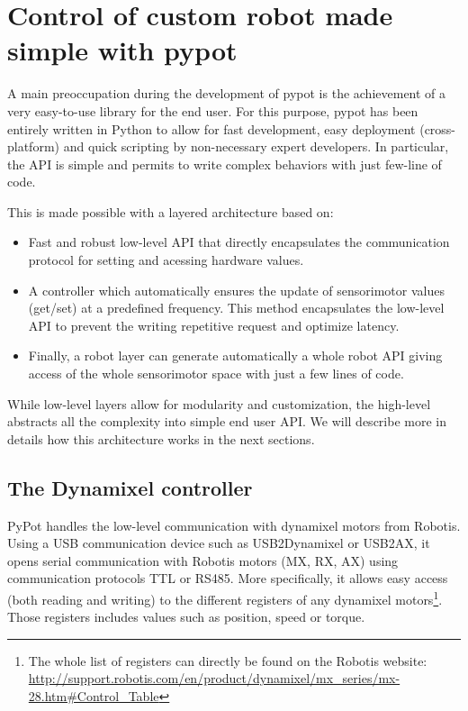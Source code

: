 \section{Control of custom robot made simple with pypot} %

A main preoccupation during the development of pypot is the achievement of a very easy-to-use library for the end user. For this purpose, pypot has been entirely written in Python to allow for fast development, easy deployment (cross-platform) and quick scripting by non-necessary expert developers. In particular, the API is simple and permits to write complex behaviors with just few-line of code.

This is made possible with a layered architecture based on:

\begin{itemize}
    \item Fast and robust low-level API that directly encapsulates the communication protocol for setting and acessing hardware values.
    \item A controller which automatically ensures the update of sensorimotor values (get/set) at a predefined frequency. This method encapsulates the low-level API to prevent the writing repetitive request and optimize latency.
    \item Finally, a robot layer can generate automatically a whole robot API giving access of the whole sensorimotor space with just a few lines of code.
\end{itemize}

While low-level layers allow for modularity and customization, the high-level abstracts all the complexity into simple end user API. We will describe more in details how this architecture works in the next sections.


\subsection{The Dynamixel controller} %

PyPot handles the low-level communication with dynamixel motors from Robotis. Using a USB communication device such as USB2Dynamixel or USB2AX, it opens serial communication with Robotis motors (MX, RX, AX) using communication protocols TTL or RS485. More specifically, it allows easy access (both reading and writing) to the different registers of any dynamixel motors\footnote{The whole list of registers can directly be found on the Robotis website: \url{http://support.robotis.com/en/product/dynamixel/mx_series/mx-28.htm\#Control_Table}}. Those registers includes values such as position, speed or torque.


